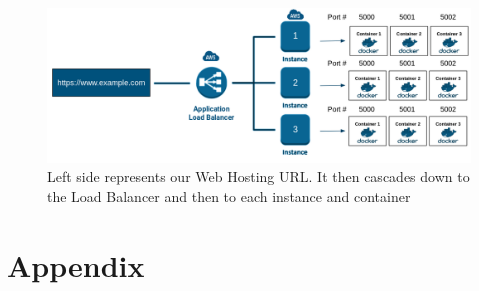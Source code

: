        \begin{figure}[h]
            \centering
            \label{fig:my_label}
            \caption{Left side represents our Web Hosting URL. It then cascades down to the Load Balancer and then to each instance and container}
            \includegraphics[width=6.5in]{img/load-balance-architecture.png}
        \end{figure}          
    
\section{Appendix}
